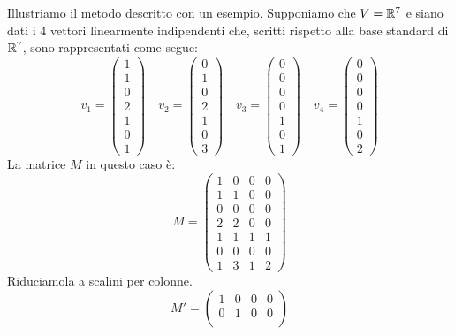 \begin{example}
	Illustriamo il metodo descritto con un esempio. Supponiamo che
	$V = \mathbb{R}^7$ e siano dati i 4 vettori linearmente
	indipendenti che, scritti rispetto alla base standard di
	$\mathbb{R}^7$, sono rappresentati come segue:
	\[
		v_1 = \begin{pmatrix}
			1 \\ 1 \\ 0 \\ 2 \\ 1 \\ 0 \\ 1
		\end{pmatrix} \quad
		v_2 = \begin{pmatrix}
			0 \\ 1 \\ 0 \\ 2 \\ 1 \\ 0 \\ 3
		\end{pmatrix} \quad
		v_3 = \begin{pmatrix}
			0 \\ 0 \\ 0 \\ 0 \\ 1 \\ 0 \\ 1
		\end{pmatrix} \quad
		v_4 = \begin{pmatrix}
			0 \\ 0 \\ 0 \\ 0 \\ 1 \\ 0 \\ 2
		\end{pmatrix}
	\]
	La matrice $M$ in questo caso è:
	\[
		M = \begin{pmatrix}
			1 & 0 & 0 & 0 \\
			1 & 1 & 0 & 0 \\
			0 & 0 & 0 & 0 \\
			2 & 2 & 0 & 0 \\
			1 & 1 & 1 & 1 \\
			0 & 0 & 0 & 0 \\
			1 & 3 & 1 & 2
		\end{pmatrix}
	\]
	Riduciamola a scalini per colonne.
	\[
		M' = \begin{pmatrix}
			1 & 0 & 0 & 0 \\
			0 & 1 & 0 & 0 \\

\end{pmatrix}\]
\end{example}
